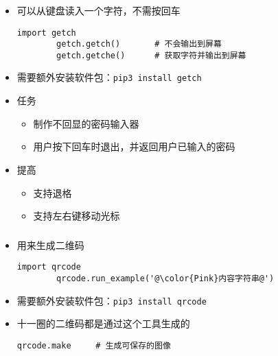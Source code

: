 \begin{CJK}{UTF8}{gbsn}
\begin{frame} [fragile]
	\frametitle{}
	\linespread{1.25}
	\begin{itemize}
	\item {}可以从键盘读入一个字符，不需按回车
		\begin{lstlisting}[style=pythonstyle, gobble=8, texcl, escapechar=@]
		import getch
		getch.getch()		# 不会输出到屏幕
		getch.getche()		# 获取字符并输出到屏幕
		\end{lstlisting}
	\item 需要额外安装软件包：\texttt{pip3 install getch}
	\item 任务
		\begin{itemize}
		\item 制作不回显的密码输入器
		\item 用户按下回车时退出，并返回用户已输入的密码
		\end{itemize}
	\item 提高
		\begin{itemize}
		\item 支持退格
		\item 支持左右键移动光标
		\end{itemize}
	\end{itemize}
\begin{comment}
import getch
def getpass() :
	l, r = '', ''
	while True :
		c = getch.getch()
		if c == '\n' :
			return l + r
		elif c == '\x7f' :
			l = l[:-1]
		elif c == '\x1b' :	# Backspace
			assert getch.getch() == '['
			c = getch.getch()
			if c == 'C' :	# Right
				if r :
					l += r[0]
					r = r[1:]
			elif c == 'D' :	# Left
				if l :
					r = l[-1] + r
					l = l[:-1]
			elif c == '3' :	# Delete
				assert getch.getch() == '~'
				r = r[1:]
		else :
			l += c
\end{comment}
\end{frame}

\begin{frame} [fragile]
	\frametitle{}
	\linespread{1.5}
	\begin{itemize}
	\item {}用来生成二维码
		\begin{lstlisting}[style=pythonstyle, gobble=8, texcl, escapechar=@]
		import qrcode
		qrcode.run_example('@\color{Pink}内容字符串@')
		\end{lstlisting}
	\item 需要额外安装软件包：\texttt{pip3 install qrcode}
	\item 十一圈的二维码都是通过这个工具生成的
		\begin{lstlisting}[style=pythonstyle, gobble=8, texcl]
		qrcode.make		# 生成可保存的图像
		\end{lstlisting}
	\end{itemize}
\end{frame}


\end{CJK}
